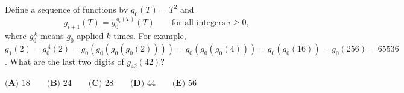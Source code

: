 Define a sequence of functions by $g_0(T)=T^2$ and
\[g_{i+1}(T)=g_0^{\,g_i(T)}(T)\qquad\text{for all integers } i\ge0,\]
where $g_0^{\,k}$ means $g_0$ applied $k$ times. For example, $g_1(2)=g_0^{\,4}(2)=g_0(g_0(g_0(g_0(2))))=g_0(g_0(g_0(4)))=g_0(g_0(16))=g_0(256)=65536$. What are the last two digits of $g_{42}(42)$?

$\textbf{(A) } 18 \qquad \textbf{(B) } 24 \qquad \textbf{(C) } 28 \qquad \textbf{(D) } 44 \qquad \textbf{(E) } 56$
